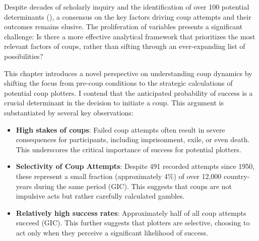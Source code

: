 \documentclass[
  12pt,
]{report}
\begin{document}
Despite decades of scholarly inquiry and the identification of over 100
potential determinants (), a consensus on the key factors driving coup attempts
and their outcomes remains elusive. The proliferation of variables
presents a significant challenge: Is there a more effective analytical
framework that prioritizes the most relevant factors of coups, rather
than sifting through an ever-expanding list of possibilities?

This chapter introduces a novel perspective on understanding coup
dynamics by shifting the focus from pre-coup conditions to the strategic
calculations of potential coup plotters. I contend that the anticipated
probability of success is a crucial determinant in the decision to
initiate a coup. This argument is substantiated by several key
observations:

\begin{itemize}
\item
  \textbf{High stakes of coups}: Failed coup attempts often result in
  severe consequences for participants, including imprisonment, exile,
  or even death. This underscores the critical importance of success for
  potential plotters.
\item
  \textbf{Selectivity of Coup Attempts}: Despite 491 recorded attempts
  since 1950, these represent a small fraction (approximately 4\%) of
  over 12,000 country-years during the same period (GIC). This suggests
  that coups are not impulsive acts but rather carefully calculated
  gambles.
\item
  \textbf{Relatively high success rates}: Approximately half of all coup
  attempts succeed (GIC). This further suggests that plotters are
  selective, choosing to act only when they perceive a significant
  likelihood of success.
\end{itemize}
\end{document}
